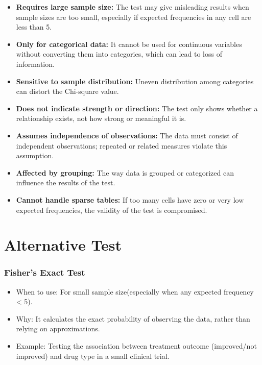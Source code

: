 \documentclass[12pt]{article}
\begin{document}
\begin{itemize}
    \item \textbf{Requires large sample size:} The test may give misleading results when sample sizes are too small, especially if expected frequencies in any cell are less than 5.
    
    \item \textbf{Only for categorical data:} It cannot be used for continuous variables without converting them into categories, which can lead to loss of information.
    
    \item \textbf{Sensitive to sample distribution:} Uneven distribution among categories can distort the Chi-square value.
    
    \item \textbf{Does not indicate strength or direction:} The test only shows whether a relationship exists, not how strong or meaningful it is.
    
    \item \textbf{Assumes independence of observations:} The data must consist of independent observations; repeated or related measures violate this assumption.
    
    \item \textbf{Affected by grouping:} The way data is grouped or categorized can influence the results of the test.
    
    \item \textbf{Cannot handle sparse tables:} If too many cells have zero or very low expected frequencies, the validity of the test is compromised.
\end{itemize}

\section{Alternative Test}

\subsubsection{Fisher's Exact Test}
\begin{itemize}
\item When to use: For small sample size(especially when any expected frequency < 5).
\item Why: It calculates the exact probability of observing the data, rather than relying on approximations.
\item Example: Testing the association between treatment outcome (improved/not improved) and drug type in a small clinical trial.
\end{itemize}
\end{document}
